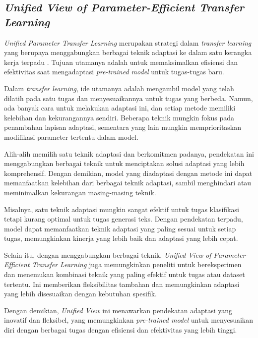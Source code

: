 \subsection{\textit{Unified View of Parameter-Efficient Transfer Learning}}

\textit{Unified Parameter Transfer Learning} merupakan strategi dalam \textit{transfer learning} yang berupaya menggabungkan berbagai teknik adaptasi ke dalam satu kerangka kerja terpadu \parencite{uvpl}. Tujuan utamanya adalah untuk memaksimalkan efisiensi dan efektivitas saat mengadaptasi \textit{pre-trained model} untuk tugas-tugas baru.

Dalam \textit{transfer learning}, ide utamanya adalah mengambil model yang telah dilatih pada satu tugas dan menyesuaikannya untuk tugas yang berbeda. Namun, ada banyak cara untuk melakukan adaptasi ini, dan setiap metode memiliki kelebihan dan kekurangannya sendiri. Beberapa teknik mungkin fokus pada penambahan lapisan adaptasi, sementara yang lain mungkin memprioritaskan modifikasi parameter tertentu dalam model.

Alih-alih memilih satu teknik adaptasi dan berkomitmen padanya, pendekatan ini menggabungkan berbagai teknik untuk menciptakan solusi adaptasi yang lebih komprehensif. Dengan demikian, model yang diadaptasi dengan metode ini dapat memanfaatkan kelebihan dari berbagai teknik adaptasi, sambil menghindari atau meminimalkan kekurangan masing-masing teknik.

Misalnya, satu teknik adaptasi mungkin sangat efektif untuk tugas klasifikasi tetapi kurang optimal untuk tugas generasi teks. Dengan pendekatan terpadu, model dapat memanfaatkan teknik adaptasi yang paling sesuai untuk setiap tugas, memungkinkan kinerja yang lebih baik dan adaptasi yang lebih cepat.

Selain itu, dengan menggabungkan berbagai teknik, \textit{Unified View of Parameter-Efficient Transfer Learning} juga memungkinkan peneliti untuk bereksperimen dan menemukan kombinasi teknik yang paling efektif untuk tugas atau dataset tertentu. Ini memberikan fleksibilitas tambahan dan memungkinkan adaptasi yang lebih disesuaikan dengan kebutuhan spesifik.

Dengan demikian, \textit{Unified View} ini menawarkan pendekatan adaptasi yang inovatif dan fleksibel, yang memungkinkan \textit{pre-trained model} untuk menyesuaikan diri dengan berbagai tugas dengan efisiensi dan efektivitas yang lebih tinggi.